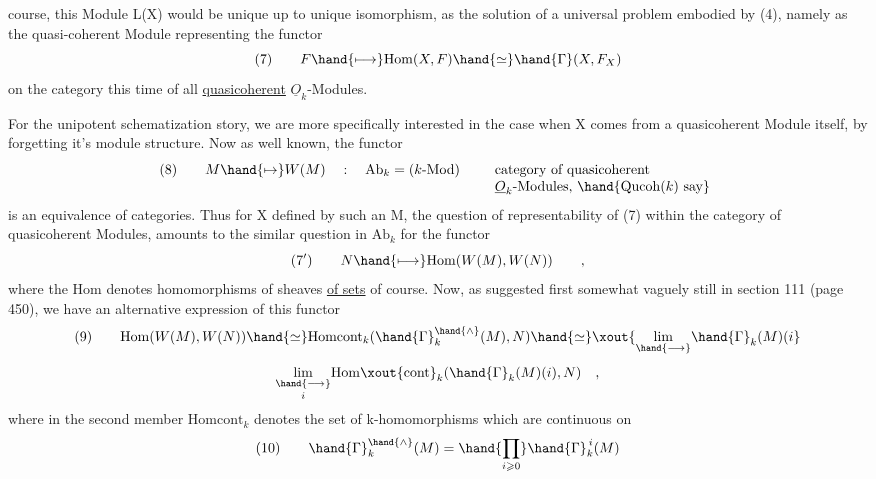 course,  this Module L(X)  would be unique up to unique isomorphism,  as
the solution of a universal problem embodied by (4),  namely as the
quasi-coherent Module representing the functor
\[ (7) \qquad F \hand{\longmapsto} \mathrm{Hom}(X,F) \hand{\simeq} \hand{\Gamma}(X,F_X) \]
on the category this time of all \uline{quasicoherent} $\underline{O}_k$-Modules.

For the unipotent schematization story,  we are more specifically
interested in the case when X comes from a quasicoherent Module itself,
by forgetting it's module structure.  Now  as well known,  the
functor
\[ (8) \qquad M \hand{\mapsto} W(M) \quad : \quad \mathrm{Ab}_k = (k\text{-Mod}) \qquad \begin{array}[t]{l} \text{category of quasicoherent} \\ \underline{O}_k\text{-Modules, } \hand{\mathrm{Qucoh}(k) \text{ say}} \end{array} \]
is an equivalence of categories.  Thus for X defined by such an M,  the
question of representability of (7)  within the category of quasicoherent
Modules,  amounts to the similar question in $\mathrm{Ab}_k$  for the functor
\[ (7') \qquad N \hand{\longmapsto} \mathrm{Hom}(W(M),W(N)) \qquad , \]
where the Hom denotes homomorphisms of sheaves \uline{of sets} of course.  Now,
as suggested first\hand{,} somewhat vaguely still\hand{,} in section 111 (page 450),
we have an alternative expression of this functor\hand{,}  
\[ (9) \qquad \mathrm{Hom}(W(M),W(N)) \hand{\simeq} \mathrm{Homcont}_k(\hand{\Gamma}_k^{\hand{\wedge}}(M),N) \hand{\simeq} \xout{\underset{\hand{\longrightarrow}}{\mathrm{lim}} \hand{\Gamma}_k(M)(i} \]
 
\[ \underset{i}{\underset{\hand{\longrightarrow}}{\mathrm{lim}}} \mathrm{Hom}\xout{\mathrm{cont}}_k(\hand{\Gamma}_k(M)(i),N) \quad , \]
where in the second member $\mathrm{Homcont}_k$ denotes the set of k-homomorphisms
which are continuous  on
\[ (10) \qquad \hand{\Gamma}_k^{\hand{\wedge}}(M) = \hand{\prod_{i \geqslant 0}} \hand{\Gamma}_k^{\,i}(M) \]

